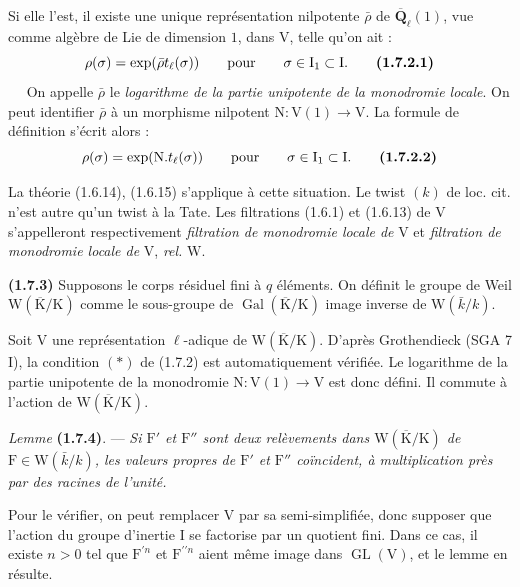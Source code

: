 \documentclass[11pt,leqno]{article}
\newcommand{\Page}[1]{\ifvmode\noindent\else\unskip\ \fi{\footnotesize\textcolor{gray}{[p.\,#1]}}\ \ignorespaces}
\begin{document}
Si elle l’est, il existe une unique représentation nilpotente \(\bar{\rho}\) de \(\overline{\mathbf{Q}}_\ell(1)\), vue comme algèbre de Lie de dimension \(1\), dans \(\mathrm{V}\), telle qu’on ait :
\[
\rho(\sigma)=\exp(\bar{\rho}t_\ell(\sigma))
\qquad\text{pour}\qquad\sigma\in\mathrm{I}_1\subset\mathrm{I}.
\tag*{\textbf{(1.7.2.1)}}
\]
\Page{171}
On appelle \(\bar{\rho}\) le \textit{logarithme de la partie unipotente de la monodromie locale}. On peut identifier \(\bar{\rho}\) à un morphisme nilpotent \(\mathrm{N}:\mathrm{V}(1)\to\mathrm{V}\). La formule de définition s’écrit alors :
\[
\rho(\sigma)=\exp(\mathrm{N}.t_\ell(\sigma))
\qquad\text{pour}\qquad\sigma\in\mathrm{I}_1\subset\mathrm{I}.
\tag*{\textbf{(1.7.2.2)}}
\]

La théorie (1.6.14), (1.6.15) s’applique à cette situation. Le twist \((k)\) de loc. cit. n’est autre qu’un twist à la Tate. Les filtrations (1.6.1) et (1.6.13) de \(\mathrm{V}\) s’appelleront respectivement \textit{filtration de monodromie locale de} \(\mathrm{V}\) et \textit{filtration de monodromie locale de} \(\mathrm{V}\), \textit{rel.} \(\mathrm{W}\).

\textbf{(1.7.3)} Supposons le corps résiduel fini à \(q\) éléments. On définit le groupe de Weil \(\mathrm{W}(\overline{\mathrm{K}}/\mathrm{K})\) comme le sous-groupe de \(\operatorname{Gal}(\overline{\mathrm{K}}/\mathrm{K})\) image inverse de \(\mathrm{W}(\bar{k}/k)\).

Soit \(\mathrm{V}\) une représentation \(\ell\)-adique de \(\mathrm{W}(\overline{\mathrm{K}}/\mathrm{K})\). D’après Grothendieck (SGA 7 I), la condition \((*)\) de (1.7.2) est automatiquement vérifiée. Le logarithme de la partie unipotente de la monodromie \(\mathrm{N}:\mathrm{V}(1)\to\mathrm{V}\) est donc défini. Il commute à l’action de \(\mathrm{W}(\overline{\mathrm{K}}/\mathrm{K})\).

\textit{Lemme} \textbf{(1.7.4)}. — \textit{Si \(\mathrm{F}'\) et \(\mathrm{F}''\) sont deux relèvements dans \(\mathrm{W}(\overline{\mathrm{K}}/\mathrm{K})\) de \(\mathrm{F}\in\mathrm{W}(\bar{k}/k)\), les valeurs propres de \(\mathrm{F}'\) et \(\mathrm{F}''\) coïncident, à multiplication près par des racines de l’unité.}

Pour le vérifier, on peut remplacer \(\mathrm{V}\) par sa semi-simplifiée, donc supposer que l’action du groupe d’inertie \(\mathrm{I}\) se factorise par un quotient fini. Dans ce cas, il existe \(n>0\) tel que \(\mathrm{F}^{\prime n}\) et \(\mathrm{F}^{\prime\prime n}\) aient même image dans \(\operatorname{GL}(\mathrm{V})\), et le lemme en résulte.
\end{document}
